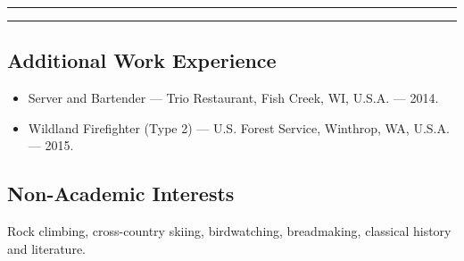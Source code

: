 \documentclass[10pt]{article}
\begin{document}
\begin{center}{\rule{2.5in}{0.5pt}}\end{center}  \begin{center}\vspace{-12pt} {\rule{2.5in}{0.5pt}}\end{center}
	
\subsection*{\textbf{Additional Work Experience}}
\begin{itemize}[label={}]
	\item Server and Bartender --- Trio Restaurant, Fish Creek, WI, U.S.A. --- 2014.
	\item Wildland Firefighter (Type 2) --- U.S. Forest Service, Winthrop, WA, U.S.A. --- 2015.
\end{itemize}


\subsection*{\textbf{Non-Academic Interests}} \hspace{5ex}
 Rock climbing, cross-country skiing, birdwatching, breadmaking, classical history and literature.

\end{document}
